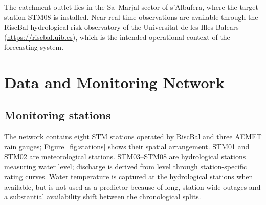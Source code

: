\documentclass[twocolumn,twoside,a4paper,10pt]{IEEEtran}
\begin{document}
The catchment outlet lies in the Sa~Marjal sector of s'Albufera, where the
target station STM08 is installed. Near-real-time observations are available
through the RiscBal hydrological-risk observatory of the Universitat de les
Illes Balears (\url{https://riscbal.uib.es}), which is the intended
operational context of the forecasting system.

\section{Data and Monitoring Network\label{sec:data}}

\subsection{Monitoring stations}

The network contains eight STM stations operated by RiscBal and three AEMET
rain gauges; Figure~\ref{fig:stations} shows their spatial arrangement. STM01
and STM02 are meteorological stations. STM03--STM08 are hydrological stations
measuring water level; discharge is derived from level through
station-specific rating curves. Water temperature is captured at the
hydrological stations when available, but is not used as a predictor because
of long, station-wide outages and a substantial availability shift between
the chronological splits.
\end{document}
